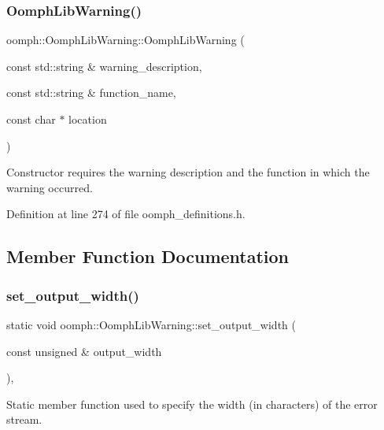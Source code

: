 \subsubsection{\texorpdfstring{Oomph\+Lib\+Warning()}{OomphLibWarning()}}
{\footnotesize\ttfamily oomph\+::\+Oomph\+Lib\+Warning\+::\+Oomph\+Lib\+Warning (\begin{DoxyParamCaption}\item[{const std\+::string \&}]{warning\+\_\+description,  }\item[{const std\+::string \&}]{function\+\_\+name,  }\item[{const char $\ast$}]{location }\end{DoxyParamCaption})\hspace{0.3cm}{\ttfamily [inline]}}



Constructor requires the warning description and the function in which the warning occurred. 



Definition at line 274 of file oomph\+\_\+definitions.\+h.



\subsection{Member Function Documentation}
\mbox{\label{classoomph_1_1OomphLibWarning_a7e6ae645796506845779005aba0b4a7a}} 
\subsubsection{\texorpdfstring{set\+\_\+output\+\_\+width()}{set\_output\_width()}}
{\footnotesize\ttfamily static void oomph\+::\+Oomph\+Lib\+Warning\+::set\+\_\+output\+\_\+width (\begin{DoxyParamCaption}\item[{const unsigned \&}]{output\+\_\+width }\end{DoxyParamCaption})\hspace{0.3cm}{\ttfamily [inline]}, {\ttfamily [static]}}



Static member function used to specify the width (in characters) of the error stream. 



